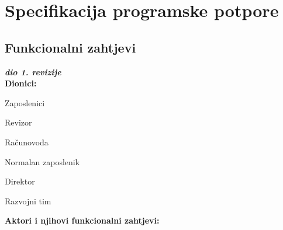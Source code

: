 \chapter{Specifikacija programske potpore}
		
	\section{Funkcionalni zahtjevi}
	
	\textbf{\textit{dio 1. revizije}}\\
	
	
	
	
	\noindent \textbf{Dionici:}
	
	\begin{packed_enum}
		
		\item Zaposlenici\begin{packed_enum}
			\item Revizor			
			\item Računovođa
			\item Normalan zaposlenik
		\end{packed_enum}
		
		\item Direktor
		\item Razvojni tim
		
		
	\end{packed_enum}
	
	\noindent \textbf{Aktori i njihovi funkcionalni zahtjevi:}
	
